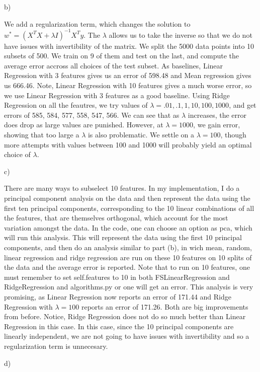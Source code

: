 \documentclass[12pt]{article}
\theoremstyle{plain}
\theoremstyle{definition}
\begin{document}
\begin{enumerate}
b) 

We add a regularization term, which changes the solution to $w^* = (X^TX + \lambda I)^{-1}X^Ty$. The $\lambda$ allows us to take the inverse so that we do not have issues with invertibility of the matrix. We split the 5000 data points into 10 subsets of 500. We train on 9 of them and test on the last, and compute the average error accross all choices of the test subset. As baselines, Linear Regression with 3 features gives us an error of 598.48 and Mean regression gives us 666.46. Note, Linear Regression with 10 features gives a much worse error, so we use Linear Regression with 3 features as a good baseline. Using Ridge Regression on all the feautres, we try values of $\lambda = .01, .1, 1, 10, 100, 1000$, and get errors of 585, 584, 577, 558, 547, 566. We can see that as $\lambda$ increases, the error does drop as large values are punished. However, at $\lambda = 1000$, we gain error, showing that too large a $\lambda$ is also problematic. We settle on a $\lambda = 100$, though more attempts with values between 100 and 1000 will probably yield an optimal choice of $\lambda$. 

c)

There are many ways to subselect 10 features. In my implementation, I do a principal component analysis on the data and then represent the data using the first ten principal components, corresponding to the 10 linear combinations of all the features, that are themselves orthogonal, which account for the most variation amongst the data. In the code, one can choose an option as pca, which will run this analysis. This will represent the data using the first 10 principal components, and then do an analysis similar to part (b), in wich mean, random, linear regression and ridge regression are run on these 10 features on 10 splits of the data and the average error is reported. Note that to run on 10 features, one must remember to set self.features to 10 in both FSLinearRegression and RidgeRegression and algorithms.py or one will get an error. This analysis is very promising, as Linear Regression now reports an error of 171.44 and Ridge Regression with $\lambda =100$ reports an error of 171.26. Both are big improvements from before. Notice, Ridge Regression does not do so much better than Linear Regression in this case. In this case, since the 10 principal components are linearly independent, we are not going to have issues with invertibility and so a regularization term is unnecesary. 

d) 


\end{enumerate}
\end{document}
